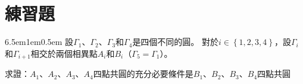 \documentclass[12pt]{article}
\begin{document}
\section{練習題}

\begin{mybox}[Problem 1]{6.5em}{1em}{0.5em}
    設$\Gamma_1$、$\Gamma_2$、$\Gamma_3$和$\Gamma_4$是四個不同的圓。
    對於$i\in\left\{1,2,3,4\right\}$，設$\Gamma_i$和$\Gamma_{i+1}$相交於兩個相異點$A_i$和$B_i$（$\Gamma_5=\Gamma_1$）。

    求證：$A_1$、$A_2$、$A_3$、$A_4$四點共圓的充分必要條件是$B_1$、$B_2$、$B_3$、$B_4$四點共圓
\end{mybox}
\iftoggle{showanswer}{
\begin{mybox}[證明]{4em}{1em}{0.5em}
    \begin{align*}
        \text{$A_1$、$A_2$、$A_3$、$A_4$四點共圓}\quad\Leftrightarrow\quad&\measuredangle{A_1A_2A_3}=\measuredangle{A_1A_4A_3}\\
        \Leftrightarrow\quad&\measuredangle{A_1A_2B_2}+\measuredangle{B_2A_2A_3}=\measuredangle{A_1A_4B_4}+\measuredangle{B_4A_4A_3}\\
        \Leftrightarrow\quad&\measuredangle{A_1B_1B_2}+\measuredangle{B_2B_3A_3}=\measuredangle{A_1B_1B_4}+\measuredangle{B_4B_3A_3}\\
        \Leftrightarrow\quad&\measuredangle{A_1B_1B_2}-\measuredangle{A_1B_1B_4}=\measuredangle{B_4B_3A_3}-\measuredangle{B_2B_3A_3}\\
        \Leftrightarrow\quad&\measuredangle{B_4B_1B_2}=\measuredangle{B_4B_3B_2}\\
        \Leftrightarrow\quad&\text{$B_1$、$B_2$、$B_3$、$B_4$四點共圓}
    \end{align*}
\end{mybox}
}{}
\end{document}
